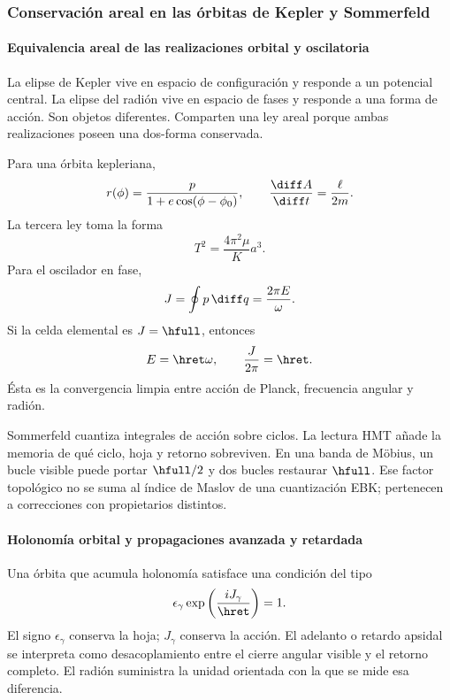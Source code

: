 \subsubsection{Conservación areal en las órbitas de Kepler y Sommerfeld}

\paragraph{Equivalencia areal de las realizaciones orbital y oscilatoria}

La elipse de Kepler vive en espacio de configuración y responde a un potencial
central. La elipse del radión vive en espacio de fases y responde a una forma
de acción. Son objetos diferentes. Comparten una ley areal porque ambas
realizaciones poseen una dos-forma conservada.

Para una órbita kepleriana,
\begin{equation}
r(\phi)=\frac{p}{1+e\cos(\phi-\phi_0)},
\qquad
\frac{\diff A}{\diff t}=\frac{\ell}{2m}.
\label{eq:kepler}
\end{equation}
La tercera ley toma la forma
\[
T^2=\frac{4\pi^2\mu}{K}a^3.
\]
Para el oscilador en fase,
\begin{equation}
J=\oint p\,\diff q=\frac{2\pi E}{\omega}.
\label{eq:osc-action}
\end{equation}
Si la celda elemental es \(J=\hfull\), entonces
\begin{equation}
E=\hret\omega,\qquad \frac{J}{2\pi}=\hret.
\label{eq:E-hbarw}
\end{equation}
Ésta es la convergencia limpia entre acción de Planck, frecuencia angular y
radión.

Sommerfeld cuantiza integrales de acción sobre ciclos. La lectura HMT añade
la memoria de qué ciclo, hoja y retorno sobreviven. En una banda de Möbius,
un bucle visible puede portar \(\hfull/2\) y dos bucles restaurar \(\hfull\).
Ese factor topológico no se suma al índice de Maslov de una cuantización EBK;
pertenecen a correcciones con propietarios distintos.

\paragraph{Holonomía orbital y propagaciones avanzada y retardada}

Una órbita que acumula holonomía satisface una condición del tipo
\begin{equation}
\epsilon_\gamma\exp\left(\frac{iJ_\gamma}{\hret}\right)=1.
\label{eq:holonomy-action}
\end{equation}
El signo \(\epsilon_\gamma\) conserva la hoja; \(J_\gamma\) conserva la
acción. El adelanto o retardo apsidal se interpreta como desacoplamiento entre
el cierre angular visible y el retorno completo. El radión suministra la
unidad orientada con la que se mide esa diferencia.

